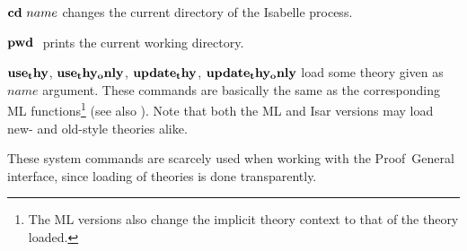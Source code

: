 \begin{descr}
\item [${\mathord{\mathbf{cd}}}~name$] changes the current directory of the Isabelle
  process.
\item [${\mathord{\mathbf{pwd}}}~$] prints the current working directory.
\item [${\mathord{\mathbf{use_thy}}}$, ${\mathord{\mathbf{use_thy_only}}}$,
  ${\mathord{\mathbf{update_thy}}}$, ${\mathord{\mathbf{update_thy_only}}}$] load some
  theory given as $name$ argument.  These commands are basically the same as
  the corresponding ML functions\footnote{The ML versions also change the
    implicit theory context to that of the theory loaded.}  (see also
  \cite[\S1,\S6]{isabelle-ref}).  Note that both the ML and Isar versions may
  load new- and old-style theories alike.
\end{descr}

These system commands are scarcely used when working with the Proof~General
interface, since loading of theories is done transparently.

